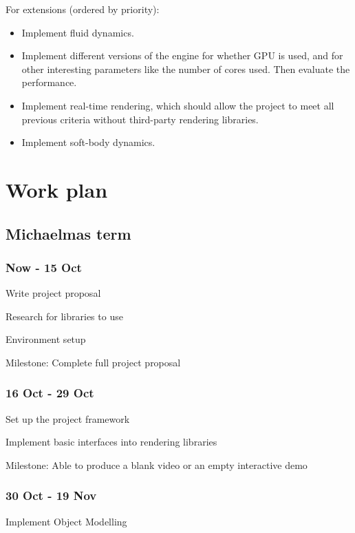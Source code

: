 \documentclass[12pt]{article}
\begin{document}
For extensions (ordered by priority):

\begin{itemize}
\item Implement fluid dynamics.

\item Implement different versions of the engine for whether GPU is used, and for other interesting parameters like the number of cores used. 
Then evaluate the performance.

\item Implement real-time rendering, which should allow the project to meet all previous criteria without third-party rendering libraries. 

\item Implement soft-body dynamics.
\end{itemize}

\section{Work plan}

\subsection*{Michaelmas term}

\subsubsection*{Now - 15 Oct}

Write project proposal

Research for libraries to use

Environment setup

Milestone: Complete full project proposal

\subsubsection*{16 Oct - 29 Oct}

Set up the project framework

Implement basic interfaces into rendering libraries

Milestone: Able to produce a blank video or an empty interactive demo

\subsubsection*{30 Oct - 19 Nov}

Implement Object Modelling
\end{document}
